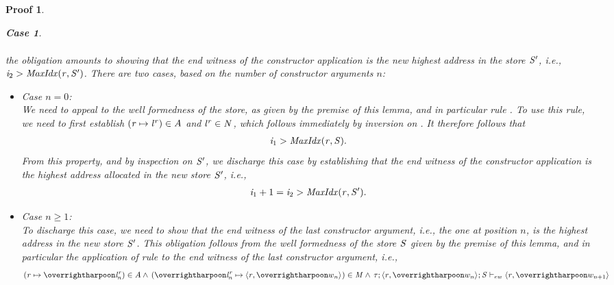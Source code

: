 \documentclass[showabstract,showacknowledgments,showpreface,showdedication]{iuphd}
\newtheorem*{bcase}{Case}
\theoremstyle{nonumberplain}
\newtheorem{nproof}{Proof}
\begin{document}
\begin{nproof}
\begin{bcase}
\begin{itemize}
\begin{itemize}
\begin{align*}
    \end{align*}
    the obligation amounts to showing that the end witness of the
    constructor application is the new highest address in the store
    $\mathit{S}'$, i.e., $\mathit{i}_2 > \mathit{MaxIdx}(\mathit{r},\mathit{S}')$.
    There are two cases, based on the number of constructor arguments $n$:
      \begin{itemize}
      \item Case $n = 0$:\\
      We need to appeal to the well formedness of the store, as given by the premise of this lemma,
      and in particular rule .
      To use  this rule, we need to first establish
      $(\mathit{r} \mapsto {\mathit{l}}^{\mathit{r}}) \in A$ and ${\mathit{l}}^{\mathit{r}} \in \mathit{N}$,
      which follows immediately by inversion on \tdatacon{}.
      It therefore follows that
      \begin{align*}
      \mathit{i}_1 > \mathit{MaxIdx}(\mathit{r},\mathit{S}).
      \end{align*}
      From this property, and by inspection on $\mathit{S}'$, we discharge
      this case by establishing that the end witness of the constructor
      application is the highest address allocated in the new store $\mathit{S}'$, i.e.,
      \begin{align*}
      \mathit{i}_1+1 = \mathit{i}_2 > \mathit{MaxIdx}(\mathit{r},\mathit{S}').
      \end{align*}
      \item Case $n \geq 1$:\\
      To discharge this case, we need to show that the end witness of the
      last constructor argument, i.e., the one at position $n$,
      is the highest address in the new store $\mathit{S}'$.
      This obligation follows from the well formedness of the
      store $\mathit{S}$ given by the premise of this lemma, and
      in particular the application of rule
      to the end witness of the last constructor argument, i.e.,
      \begin{align*}
      (\reg \mapsto \overharpoon{\locreg{\loc}{\reg}_n}) \in A \wedge 
    \, (\overharpoon{\locreg{\loc}{\reg}_n} \mapsto \concreteloc{\reg}{\overharpoon{w_n}}{}) \in \MENV \wedge
    \, \ewitness{\TYP}{\concreteloc{\reg}{\overharpoon{w_n}}{}}{\STOR}{\concreteloc{\reg}{\overharpoon{w_{n+1}}}{}}

\end{align*}
\end{itemize}
\end{itemize}
\end{itemize}
\end{bcase}
\end{nproof}
\end{document}
